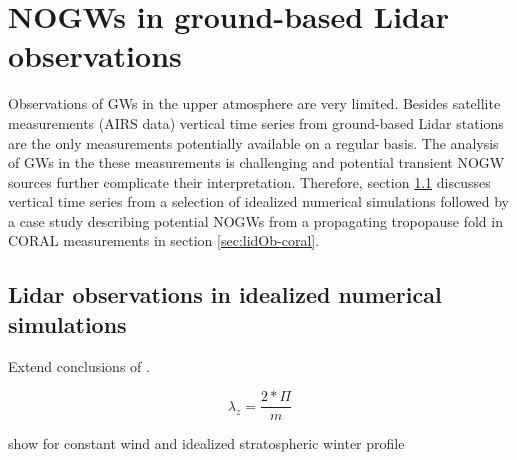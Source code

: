 \chapter{NOGWs in ground-based Lidar observations}

Observations of GWs in the upper atmosphere are very limited. Besides satellite measurements (AIRS data) vertical time series from ground-based Lidar stations are the only measurements potentially available on a regular basis. The analysis of GWs in the these measurements is challenging and potential transient NOGW sources further complicate their interpretation. Therefore, section \ref{sec:lidOb-idealized} discusses vertical time series from a selection of idealized numerical simulations followed by a case study describing potential NOGWs from a propagating tropopause fold in CORAL measurements in section \ref{sec:lidOb-coral}.
 
\section{Lidar observations in idealized numerical simulations}
\label{sec:lidOb-idealized}

Extend conclusions of \textcite{dornbrack_interpretation_2017}.



\begin{equation}
    \lambda_z = \frac{2*\Pi}{m} 
\end{equation}






show for constant wind and idealized stratospheric winter profile

